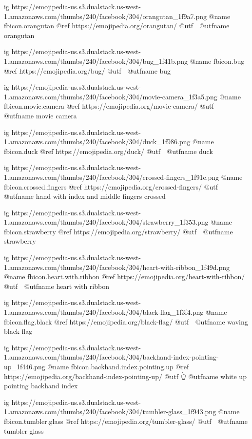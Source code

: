   ig https://emojipedia-us.s3.dualstack.us-west-1.amazonaws.com/thumbs/240/facebook/304/orangutan_1f9a7.png
  @name fbicon.orangutan
  @ref https://emojipedia.org/orangutan/
  @utf 🦧
  @utfname orangutan

  ig https://emojipedia-us.s3.dualstack.us-west-1.amazonaws.com/thumbs/240/facebook/304/bug_1f41b.png
  @name fbicon.bug
  @ref https://emojipedia.org/bug/
  @utf 🐛
  @utfname bug

  ig https://emojipedia-us.s3.dualstack.us-west-1.amazonaws.com/thumbs/240/facebook/304/movie-camera_1f3a5.png
  @name fbicon.movie.camera
  @ref https://emojipedia.org/movie-camera/
  @utf 🎥
  @utfname movie camera

  ig https://emojipedia-us.s3.dualstack.us-west-1.amazonaws.com/thumbs/240/facebook/304/duck_1f986.png
  @name fbicon.duck
  @ref https://emojipedia.org/duck/
  @utf 🦆
  @utfname duck

  ig https://emojipedia-us.s3.dualstack.us-west-1.amazonaws.com/thumbs/240/facebook/304/crossed-fingers_1f91e.png
  @name fbicon.crossed.fingers
  @ref https://emojipedia.org/crossed-fingers/
  @utf 🤞
  @utfname hand with index and middle fingers crossed

  ig https://emojipedia-us.s3.dualstack.us-west-1.amazonaws.com/thumbs/240/facebook/304/strawberry_1f353.png
  @name fbicon.strawberry
  @ref https://emojipedia.org/strawberry/
  @utf 🍓
  @utfname strawberry

  ig https://emojipedia-us.s3.dualstack.us-west-1.amazonaws.com/thumbs/240/facebook/304/heart-with-ribbon_1f49d.png
  @name fbicon.heart.with.ribbon
  @ref https://emojipedia.org/heart-with-ribbon/
  @utf 💝
  @utfname heart with ribbon

  ig https://emojipedia-us.s3.dualstack.us-west-1.amazonaws.com/thumbs/240/facebook/304/black-flag_1f3f4.png
  @name fbicon.flag.black
  @ref https://emojipedia.org/black-flag/
  @utf 🏴
  @utfname waving black flag

  ig https://emojipedia-us.s3.dualstack.us-west-1.amazonaws.com/thumbs/240/facebook/304/backhand-index-pointing-up_1f446.png
  @name fbicon.backhand.index.pointing.up
  @ref https://emojipedia.org/backhand-index-pointing-up/
  @utf 👆
  @utfname white up pointing backhand index

  ig https://emojipedia-us.s3.dualstack.us-west-1.amazonaws.com/thumbs/240/facebook/304/tumbler-glass_1f943.png
  @name fbicon.tumbler.glass
  @ref https://emojipedia.org/tumbler-glass/
  @utf 🥃
  @utfname tumbler glass



